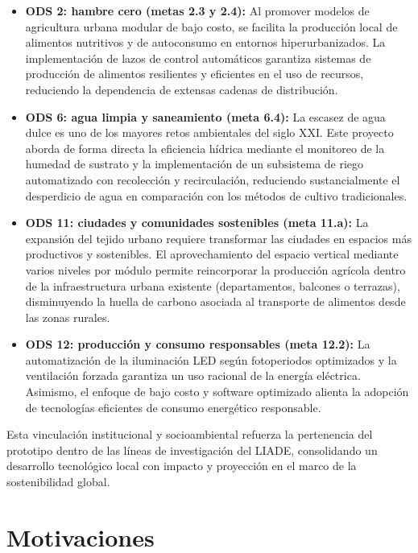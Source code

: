 \begin{itemize}
    \item \textbf{ODS 2: hambre cero (metas 2.3 y 2.4):} Al promover modelos de agricultura urbana modular de bajo costo, se facilita la producción local de alimentos nutritivos y de autoconsumo en entornos hiperurbanizados. La implementación de lazos de control automáticos garantiza sistemas de producción de alimentos resilientes y eficientes en el uso de recursos, reduciendo la dependencia de extensas cadenas de distribución.
    
    \item \textbf{ODS 6: agua limpia y saneamiento (meta 6.4):} La escasez de agua dulce es uno de los mayores retos ambientales del siglo XXI. Este proyecto aborda de forma directa la eficiencia hídrica mediante el monitoreo de la humedad de sustrato y la implementación de un subsistema de riego automatizado con recolección y recirculación, reduciendo sustancialmente el desperdicio de agua en comparación con los métodos de cultivo tradicionales.
    
    \item \textbf{ODS 11: ciudades y comunidades sostenibles (meta 11.a):} La expansión del tejido urbano requiere transformar las ciudades en espacios más productivos y sostenibles. El aprovechamiento del espacio vertical mediante varios niveles por módulo permite reincorporar la producción agrícola dentro de la infraestructura urbana existente (departamentos, balcones o terrazas), disminuyendo la huella de carbono asociada al transporte de alimentos desde las zonas rurales.
    
    \item \textbf{ODS 12: producción y consumo responsables (meta 12.2):} La automatización de la iluminación LED según fotoperiodos optimizados y la ventilación forzada garantiza un uso racional de la energía eléctrica. Asimismo, el enfoque de bajo costo y software optimizado alienta la adopción de tecnologías eficientes de consumo energético responsable.
\end{itemize}

Esta vinculación institucional y socioambiental refuerza la pertenencia del prototipo dentro de las líneas de investigación del LIADE, consolidando un desarrollo tecnológico local con impacto y proyección en el marco de la sostenibilidad global.

\section{Motivaciones}
\label{sec:motivaciones}


